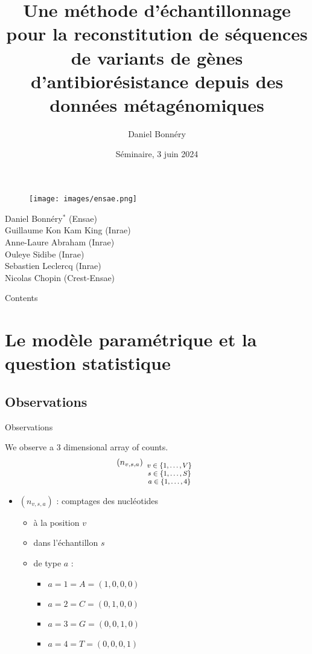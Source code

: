 \documentclass{beamer}
\author[Daniel Bonnéry]{Daniel Bonnéry}
\institute[]{}
\title[Reconstitution de séquences de variants ]{Une méthode d’échantillonnage pour la reconstitution de séquences de variants de gènes d'antibiorésistance depuis des données métagénomiques}
\date[2024/09/30]{Séminaire, \small 3 juin 2024}
\newcommand{\fr}[1]{#1}
\newcommand{\en}[1]{}
\begin{document}
{


\begin{frame}\label{start}
    \titlepage
        
    \begin{figure}
            \texttt{[image: images/ensae.png]} 
    \end{figure}
\end{frame}
}
\begin{frame}
        Daniel Bonnéry$^*$ (Ensae)\\
        Guillaume Kon Kam King (Inrae)\\
        Anne-Laure Abraham (Inrae)\\
	Ouleye Sidibe (Inrae)\\
	Sebastien Leclercq (Inrae)\\
        Nicolas Chopin (Crest-Ensae)
\end{frame}
\begin{frame}{Contents}
    \tableofcontents[sectionstyle=show, subsectionstyle=show/shaded/hide, subsubsectionstyle=show/shaded/hide]
\end{frame}

\section{\fr{Le modèle paramétrique et la question statistique}\en{The parametric model and the statistical question}}
\subsection{Observations}
\begin{frame}{Observations}

We observe a 3 dimensional array of counts.
$$\left(n_{v,s,a}\right)_{\footnotesize\begin{array}{c}
v\in\{1,\ldots,V\}\\
s\in\{1,\ldots,S\}\\
a\in \{1,\ldots,4\}\end{array}}$$

\begin{itemize}
\item $(n_{v,s,a})$ : \fr{comptages des nucléotides}\en{counts of nucleotides}
    \begin{itemize}
\item \fr{à la position}\en{at position} $v$
\item \fr{dans l'échantillon}\en{in sample} $s$
\item \fr{de type}\en{of type} $a$ :
    \begin{itemize}
    \item $a=1=A=(1,0,0,0)$
    \item $a=2=C=(0,1,0,0)$
    \item $a=3=G=(0,0,1,0)$
    \item $a=4=T=(0,0,0,1)$
    \end{itemize}
\end{itemize}
\end{itemize}
\end{frame}
\end{document}
